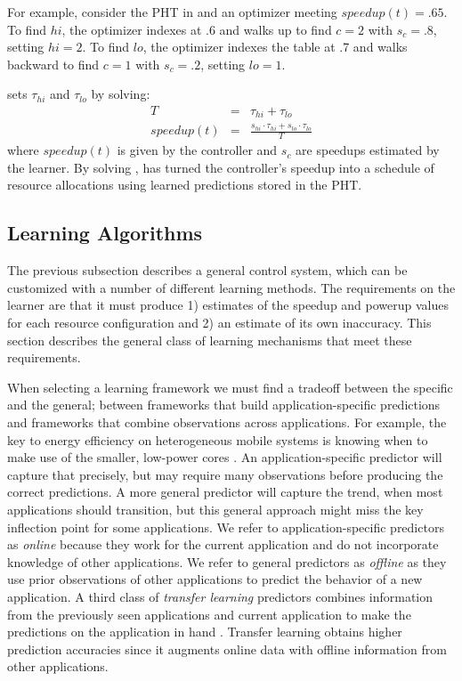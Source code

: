 For example, consider the PHT in  and an optimizer
meeting $speedup(t) = .65$.  To find $hi$, the optimizer indexes at .6
and walks up to find $c=2$ with $s_c=.8$, setting $hi = 2$.  To find
$lo$, the optimizer indexes the table at .7 and walks backward to find
$c=1$ with $s_c=.2$, setting $lo = 1$.

\SYSTEM{} sets $\tau_{hi}$ and $\tau_{lo}$ by solving:
\begin{eqnarray}
  T &=& \tau_{hi} + \tau_{lo}    \label{eqn:s1} \\
  speedup(t) &=& \frac{s_{hi} \cdot \tau_{hi} + s_{lo} \cdot \tau_{lo}}{T} \label{eqn:s2}
\end{eqnarray}
where $speedup(t)$ is given by the controller and $s_c$ are speedups
estimated by the learner.  By solving , \SYSTEM{} has
turned the controller's speedup into a schedule of resource
allocations using learned predictions stored in the PHT.

\subsection{\SYSTEM{} Learning Algorithms}
The previous subsection describes a general control system, which can
be customized with a number of different learning methods.  The
requirements on the learner are that it must produce 1) estimates of
the speedup and powerup values for each resource configuration and 2)
an estimate of its own inaccuracy.
This section describes the general class of learning mechanisms that
meet these requirements. 

When selecting a learning framework we must find a tradeoff between
the specific and the general; \ie between frameworks that build
application-specific predictions and frameworks that combine
observations across applications.  For example, the key to energy
efficiency on heterogeneous mobile systems is knowing when to make use
of the smaller, low-power cores
\cite{kim-cpsna,Carroll2013,LeSueur11}.  An application-specific
predictor will capture that precisely, but may require many
observations before producing the correct predictions.  A more general
predictor will capture the trend, \eg when most applications should
transition, but this general approach might miss the key inflection
point for some applications.  We refer to application-specific
predictors as \emph{online} because they work for the current
application and do not incorporate knowledge of other applications.
We refer to general predictors as \emph{offline} as they use prior
observations of other applications to predict the behavior of a new
application. A third class of \emph{transfer learning} predictors
combines information from the previously seen applications and current
application to make the predictions on the application in hand
\cite{pan2010survey}. Transfer learning obtains higher prediction
accuracies since it augments online data with offline information from
other applications.

